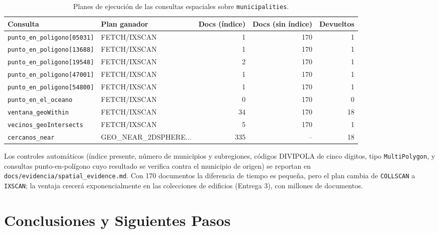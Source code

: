\documentclass[12pt, letterpaper]{article}
\begin{document}
\begin{table}[H]
\centering
\small
{}
\begin{tabularx}{\textwidth}{X l r r r}
\toprule
\textbf{Consulta} & \textbf{Plan ganador} & \textbf{Docs (índice)} & \textbf{Docs (sin índice)} & \textbf{Devueltos} \\
\midrule
\texttt{punto\_en\_poligono[05031]} & FETCH/IXSCAN & 1 & 170 & 1 \\
\texttt{punto\_en\_poligono[13688]} & FETCH/IXSCAN & 1 & 170 & 1 \\
\texttt{punto\_en\_poligono[19548]} & FETCH/IXSCAN & 2 & 170 & 1 \\
\texttt{punto\_en\_poligono[47001]} & FETCH/IXSCAN & 1 & 170 & 1 \\
\texttt{punto\_en\_poligono[54800]} & FETCH/IXSCAN & 1 & 170 & 1 \\
\texttt{punto\_en\_el\_oceano} & FETCH/IXSCAN & 0 & 170 & 0 \\
\texttt{ventana\_geoWithin} & FETCH/IXSCAN & 34 & 170 & 18 \\
\texttt{vecinos\_geoIntersects} & FETCH/IXSCAN & 5 & 170 & 1 \\
\texttt{cercanos\_near} & GEO\_NEAR\_2DSPHERE... & 335 & -- & 18 \\
\bottomrule
\end{tabularx}
\caption{Planes de ejecución de las consultas espaciales sobre \texttt{municipalities}.}
\label{tab:evidencia}
\end{table}

Los controles automáticos (índice presente, número de municipios y subregiones, códigos DIVIPOLA de cinco dígitos, tipo \texttt{MultiPolygon}, y consultas punto-en-polígono cuyo resultado se verifica contra el municipio de origen) se reportan en \texttt{docs/evidencia/spatial\_evidence.md}. Con 170 documentos la diferencia de tiempo es pequeña, pero el plan cambia de \texttt{COLLSCAN} a \texttt{IXSCAN}; la ventaja crecerá exponencialmente en las colecciones de edificios (Entrega 3), con millones de documentos.

\section{Conclusiones y Siguientes Pasos}
\end{document}
